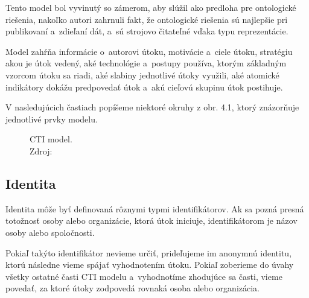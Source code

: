 \documentclass[12pt, a4paper, oneside]{book}
\begin{document}
Tento model bol vyvinutý so zámerom, aby slúžil ako predloha pre ontologické riešenia, nakoľko autori zahrnuli fakt, že ontologické riešenia sú najlepšie pri publikovaní a~zdieľaní dát, a~sú strojovo čitateľné vďaka typu reprezentácie.


Model zahŕňa informácie o~autorovi útoku, motivácie a~ciele útoku, stratégiu akou je útok vedený, aké technológie a~postupy používa, ktorým základným vzorcom útoku sa riadi, aké slabiny jednotlivé útoky využili, aké atomické indikátory dokážu predpovedať útok a~akú cieľovú skupinu útok postihuje.


V nasledujúcich častiach popíšeme niektoré okruhy z obr. 4.1, ktorý znázorňuje jednotlivé prvky modelu.


\begin{figure}
\label{fig:semantic_web}
\caption{CTI model.\\Zdroj: \citep{MavroeidisB17}}

\end{figure}

\subsection{Identita}
Identita môže byť definovaná rôznymi typmi identifikátorov. Ak sa pozná presná totožnosť osoby alebo organizácie, ktorá útok iniciuje, identifikátorom je názov osoby alebo spoločnosti.


Pokiaľ takýto identifikátor nevieme určiť, prideľujeme im anonymnú identitu, ktorú následne vieme spájať vyhodnotením útoku. Pokiaľ zoberieme do úvahy všetky ostatné časti CTI modelu a~vyhodnotíme zhodujúce sa časti, vieme povedať, za ktoré útoky zodpovedá rovnaká osoba alebo organizácia.
\end{document}
